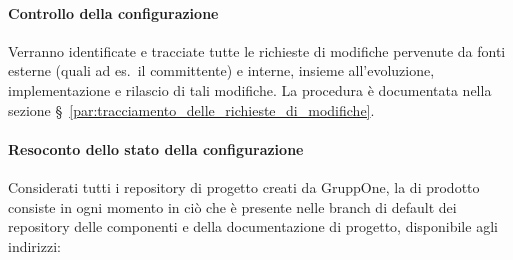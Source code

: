 \documentclass[../../norme-di-progetto.tex]{subfiles}
\begin{document}








\paragraph{Controllo della configurazione}%
\label{par:controllo_della_configurazione}

Verranno identificate e tracciate tutte le richieste di modifiche pervenute da fonti esterne (quali ad es.\ il committente) e interne, insieme all'evoluzione, implementazione e rilascio di tali modifiche.
La procedura è documentata nella sezione §~\ref{par:tracciamento_delle_richieste_di_modifiche}.


\paragraph{Resoconto dello stato della configurazione}%
\label{par:resoconto_dello_stato_della_configurazione}

Considerati tutti i repository di progetto creati da GruppOne, la  di prodotto consiste in ogni momento in ciò che è presente nelle branch di default dei repository delle componenti e della documentazione di progetto, disponibile agli indirizzi:
\end{document}

